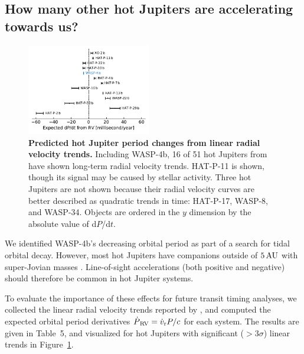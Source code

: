 \documentclass[12pt,twocolumn,tighten]{aastex62}
\begin{document}
\subsection{How many other hot Jupiters are accelerating towards us?}

\begin{figure}[t]
	\begin{center}
		\leavevmode
		\includegraphics[width=0.48\textwidth]{f5.pdf}
	\end{center}
	\vspace{-0.4cm}
	\caption{
  {\bf Predicted hot Jupiter period changes from linear radial
  velocity trends.} Including WASP-4b, 16 of 51 hot Jupiters from
  \citet{knutson_friends_2014} have shown long-term radial velocity
  trends.  HAT-P-11 is shown, though its signal may be caused
  by stellar activity.  Three hot Jupiters are not shown because
  their radial velocity curves are better described as quadratic
  trends in time: HAT-P-17, WASP-8, and WASP-34.  Objects are ordered
  in the $y$ dimension by the absolute value of d$P$/d$t$.
	\label{fig:pdot_pop}
  \vspace{-0.3cm}
	}
\end{figure}

We identified WASP-4b's decreasing orbital period as part of a search
for tidal orbital decay.  However, most hot Jupiters have companions
outside of $5\,{\rm AU}$ with super-Jovian masses
\citep{knutson_friends_2014,bryan_statistics_2016}.  Line-of-sight
accelerations (both positive and negative)
should therefore be common in hot Jupiter systems. 

To evaluate the importance of these effects for future transit timing
analyses, we collected the linear radial velocity trends reported by
\citet{knutson_friends_2014}, and computed the expected orbital period
derivatives $\dot{P}_{\rm\,RV} = \dot{v}_{\rm r} P/c$ for each system.
The results are given in Table~5, and visualized for hot Jupiters with
significant ($>$$3\sigma$) linear trends in Figure~\ref{fig:pdot_pop}.
\end{document}
